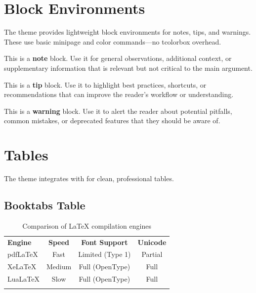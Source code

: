 \documentclass[11pt, a4paper]{article}
\begin{document}
\section{Block Environments}

The theme provides lightweight block environments for notes, tips, and warnings.
These use basic minipage and color commands---no tcolorbox overhead.

\begin{noteblock}
This is a \textbf{note} block. Use it for general observations, additional
context, or supplementary information that is relevant but not critical to
the main argument.
\end{noteblock}

\begin{tipblock}
This is a \textbf{tip} block. Use it to highlight best practices, shortcuts,
or recommendations that can improve the reader's workflow or understanding.
\end{tipblock}

\begin{warningblock}
This is a \textbf{warning} block. Use it to alert the reader about potential
pitfalls, common mistakes, or deprecated features that they should be aware of.
\end{warningblock}


\section{Tables}

The theme integrates with  for clean, professional tables.

\subsection{Booktabs Table}

\begin{table}[H]
  \centering
  \caption{Comparison of LaTeX compilation engines}
  \label{tab:engines}
  \begin{tabular}{l c c c}
    \swarmtoprule
    \textbf{Engine}   & \textbf{Speed} & \textbf{Font Support} & \textbf{Unicode} \\
    \swarmmidrule
    pdfLaTeX           & Fast           & Limited (Type 1)      & Partial          \\
    XeLaTeX            & Medium         & Full (OpenType)        & Full             \\
    LuaLaTeX           & Slow           & Full (OpenType)        & Full             \\
    \swarmbottomrule
  \end{tabular}
\end{table}
\end{document}
